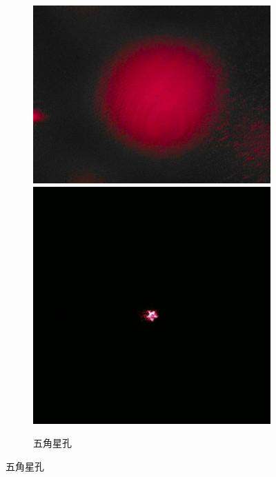\documentclass[a4paper]{article}
\begin{document}
\begin{figure}[htbp]
\begin{subfigure}[htbp]{0.3\textwidth}
        \label{2-5}
    \end{subfigure}
    \begin{subfigure}[htbp]{0.3\textwidth}
        \centering
        \includegraphics[width=\textwidth]{fre-done/2-6.JPG}
        \includegraphics[width=\textwidth]{img-done/2-6.JPG}
        \caption{五角星孔}
        \label{2-6}
    \end{subfigure}

\end{figure}
\end{document}
